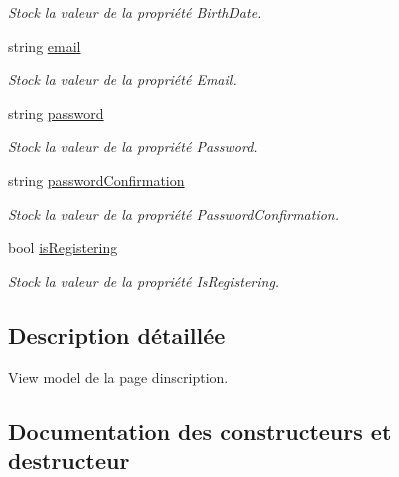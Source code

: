 \begin{DoxyCompactItemize}
\begin{DoxyCompactList}\small\item\em Stock la valeur de la propriété {\ttfamily Birth\+Date}. \end{DoxyCompactList}\item 
string \hyperlink{class_boxes_1_1_view_models_1_1_register_view_model_a00629f6700b5704fe4c8c6dfded6d011}{email}
\begin{DoxyCompactList}\small\item\em Stock la valeur de la propriété {\ttfamily Email}. \end{DoxyCompactList}\item 
string \hyperlink{class_boxes_1_1_view_models_1_1_register_view_model_a3aead86ad1596454c581f6cc9fd02c76}{password}
\begin{DoxyCompactList}\small\item\em Stock la valeur de la propriété {\ttfamily Password}. \end{DoxyCompactList}\item 
string \hyperlink{class_boxes_1_1_view_models_1_1_register_view_model_a034d4b47eaa785324c2dd5f665feef66}{password\+Confirmation}
\begin{DoxyCompactList}\small\item\em Stock la valeur de la propriété {\ttfamily Password\+Confirmation}. \end{DoxyCompactList}\item 
bool \hyperlink{class_boxes_1_1_view_models_1_1_register_view_model_a59a3575b50e2d42c2cf48d09421f4562}{is\+Registering}
\begin{DoxyCompactList}\small\item\em Stock la valeur de la propriété {\ttfamily Is\+Registering}. \end{DoxyCompactList}\end{DoxyCompactItemize}


\subsection{Description détaillée}
View model de la page d\textquotesingle{}inscription. 



\subsection{Documentation des constructeurs et destructeur}
